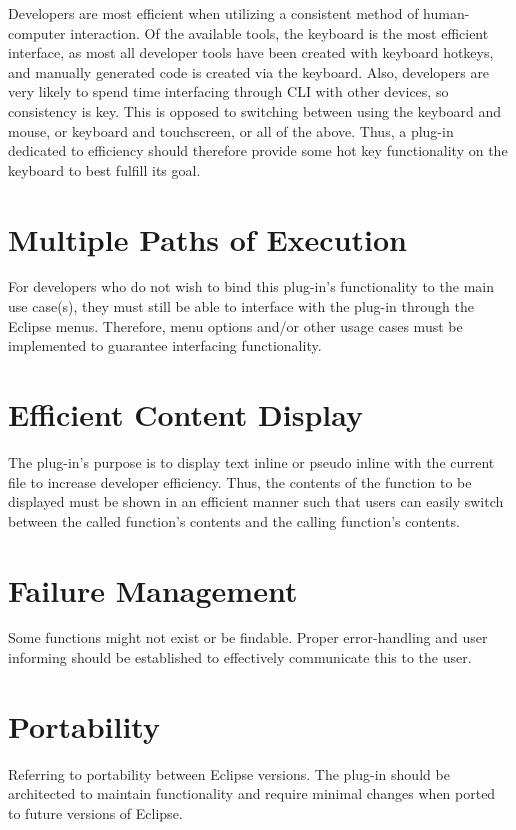 \documentclass[]{report}
\begin{document}
		Developers are most efficient when utilizing a consistent method of human-computer interaction.  Of the available tools, the keyboard is the most efficient interface, as most all developer tools have been created with keyboard hotkeys, and manually generated code is created via the keyboard.  Also, developers are very likely to spend time interfacing through CLI with other devices, so consistency is key.  This is opposed to switching between using the keyboard and mouse, or keyboard and touchscreen, or all of the above.  Thus, a plug-in dedicated to efficiency should therefore provide some hot key functionality on the keyboard to best fulfill its goal.
	
	\section{Multiple Paths of Execution}
	
		For developers who do not wish to bind this plug-in's functionality to the main use case(s), they must still be able to interface with the plug-in through the Eclipse menus.  Therefore, menu options and/or other usage cases must be implemented to guarantee interfacing functionality.
	
	\section{Efficient Content Display}
	
		The plug-in's purpose is to display text inline or pseudo inline with the current file to increase developer efficiency.  Thus, the contents of the function to be displayed must be shown in an efficient manner such that users can easily switch between the called function's contents and the calling function's contents.
	
	\section{Failure Management}
	
		Some functions might not exist or be findable.  Proper error-handling and user informing should be established to effectively communicate this to the user.
	
	\section{Portability}
	
		Referring to portability between Eclipse versions.  The plug-in should be architected to maintain functionality and require minimal changes when ported to future versions of Eclipse.
	
\end{document}
